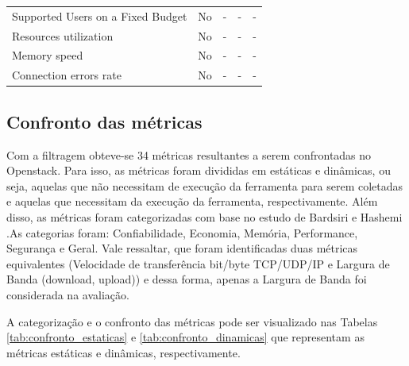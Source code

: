 \documentclass[conference]{IEEEtran}
\begin{document}
\begin{table}[]
\begin{tabular}{@{}lcccc@{}}
Supported Users on a Fixed Budget          & \cellcolor[HTML]{EA9999}No             & \cellcolor[HTML]{EA9999}-               & \cellcolor[HTML]{EA9999}-               & \cellcolor[HTML]{EA9999}-   \\
Resources utilization                            & \cellcolor[HTML]{EA9999}No             & \cellcolor[HTML]{EA9999}-               & \cellcolor[HTML]{EA9999}-               & \cellcolor[HTML]{EA9999}-   \\
Memory speed                             & \cellcolor[HTML]{EA9999}No             & \cellcolor[HTML]{EA9999}-               & \cellcolor[HTML]{EA9999}-               & \cellcolor[HTML]{EA9999}-   \\
Connection errors rate                          & \cellcolor[HTML]{EA9999}No             & \cellcolor[HTML]{EA9999}-               & \cellcolor[HTML]{EA9999}-               & \cellcolor[HTML]{EA9999}-   \\ \bottomrule
\end{tabular}
\end{table}
   
  \subsection{Confronto das métricas} \label{confronto}
  
  Com a filtragem obteve-se 34 métricas resultantes a serem confrontadas no Openstack. Para isso, as métricas foram divididas em estáticas e
  dinâmicas, ou seja, aquelas que não necessitam de execução da ferramenta para serem coletadas e aquelas que necessitam da execução da ferramenta,
  respectivamente. Além disso, as métricas foram categorizadas com base no estudo de Bardsiri e Hashemi \cite{bardsiri2014}.As categorias foram:
  Confiabilidade, Economia, Memória, Performance, Segurança e Geral. Vale ressaltar, que foram identificadas duas métricas equivalentes (Velocidade de transferência bit/byte TCP/UDP/IP
  e Largura de Banda (download, upload)) e dessa forma, apenas a Largura de Banda foi considerada na avaliação.
  
  A categorização e o confronto das métricas pode ser visualizado nas Tabelas   \ref{tab:confronto_estaticas} e \ref{tab:confronto_dinamicas}  
 que representam as métricas estáticas e dinâmicas, respectivamente. 
\end{document}
